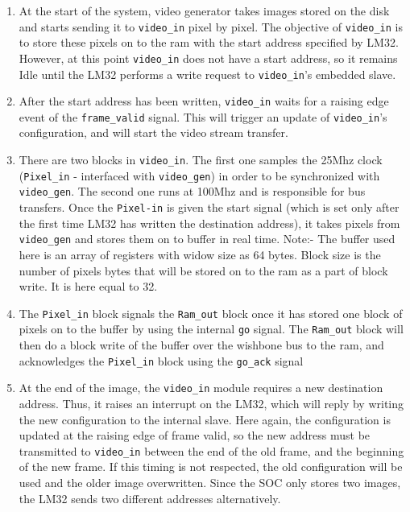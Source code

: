 \begin{enumerate}

\item At the start of the system, video generator takes images stored on the disk and starts sending it to \texttt{video\_in} pixel by pixel. The objective of \texttt{video\_in} is to store these pixels on to the ram with the start address specified by LM32. However, at this point \texttt{video\_in} does not have a start address, so it remains Idle until the LM32 performs a write request to \texttt{video\_in}'s embedded slave.

\item After the start address has been written, \texttt{video\_in} waits for a raising edge event of the \texttt{frame\_valid} signal. This will trigger an update of \texttt{video\_in}'s configuration, and will start the video stream transfer.

\item There are two blocks in \texttt{video\_in}. The first one samples the 25Mhz clock (\texttt{Pixel\_in} - interfaced with \texttt{video\_gen}) in order to be synchronized with \texttt{video\_gen}. The second one runs at 100Mhz and is responsible for bus transfers. Once the \texttt{Pixel-in} is given the start signal (which is set only after the first time LM32 has written the destination address), it takes pixels from \texttt{video\_gen} and stores them on to buffer in real time.
Note:- The buffer used here is an array of registers with widow size as 64 bytes. Block size is the number of pixels bytes that will be stored on to the ram as a part of block write. It is here equal to 32.

\item The \texttt{Pixel\_in} block signals the \texttt{Ram\_out} block once it has stored one block of pixels on to the buffer by using the internal \texttt{go} signal. The \texttt{Ram\_out} block will then do a block write of the buffer over the wishbone bus to the ram, and acknowledges the \texttt{Pixel\_in} block using the \texttt{go\_ack} signal

\item At the end of the image, the \texttt{video\_in} module requires a new destination address. Thus, it raises an interrupt on the LM32, which will reply by writing the new configuration to the internal slave. Here again, the configuration is updated at the raising edge of frame valid, so the new address must be transmitted to \texttt{video\_in} between the end of the old frame, and the beginning of the new frame. If this timing is not respected, the old configuration will be used and the older image overwritten. Since the SOC only stores two images, the LM32 sends two different addresses alternatively.


\end{enumerate}

